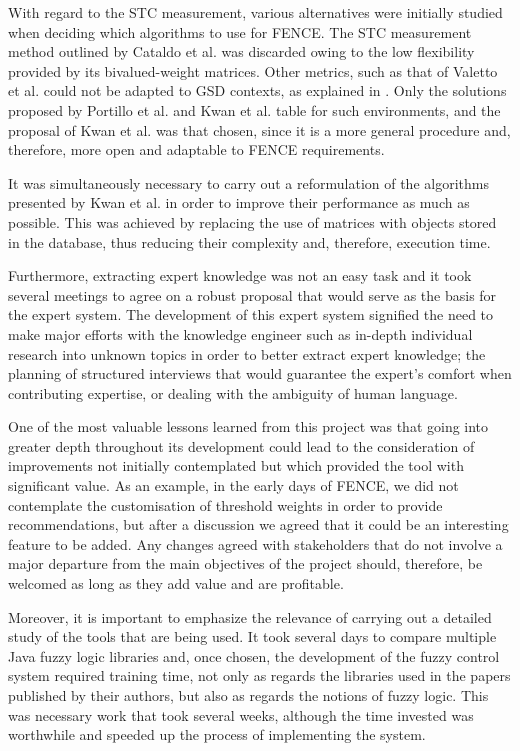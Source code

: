 With regard to the STC measurement, various alternatives were initially studied when deciding which algorithms to use for FENCE. The STC measurement method outlined by Cataldo et al. \cite{cataldo_identification_2006, cataldo_socio-technical_2008} was discarded owing to the low flexibility provided by its bivalued-weight matrices. Other metrics, such as that of Valetto et al. \cite{valetto_using_2007} could not be adapted to GSD contexts, as explained in \cite{sierra_systematic_2018}. Only the solutions proposed by Portillo et al. \cite{portillo_2014} and Kwan et al. \cite{kwan_weighted_2009, kwan_does_2011} table for such environments, and the proposal of Kwan et al. was that chosen, since it is a more general procedure and, therefore, more open and adaptable to FENCE requirements.

It was simultaneously necessary to carry out a reformulation of the algorithms presented by Kwan et al. in order to improve their performance as much as possible. This was achieved by replacing the use of matrices with objects stored in the database, thus reducing their complexity and, therefore, execution time.

Furthermore, extracting expert knowledge was not an easy task and it took several meetings to agree on a robust proposal that would serve as the basis for the expert system. The development of this expert system signified the need to make major efforts with the knowledge engineer such as in-depth individual research into unknown topics in order to better extract expert knowledge; the planning of structured interviews that would guarantee the expert's comfort when contributing expertise, or dealing with the ambiguity of human language.

One of the most valuable lessons learned from this project was that going into greater depth throughout its development could lead to the consideration of improvements not initially contemplated but which provided the tool with significant value. As an example, in the early days of FENCE, we did not contemplate the customisation of threshold weights in order to provide recommendations, but after a discussion we agreed that it could be an interesting feature to be added. Any changes agreed with stakeholders that do not involve a major departure from the main objectives of the project should, therefore, be welcomed as long as they add value and are profitable.

Moreover, it is important to emphasize the relevance of carrying out a detailed study of the tools that are being used. It took several days to compare multiple Java fuzzy logic libraries and, once chosen, the development of the fuzzy control system required training time, not only as regards the libraries used in the papers published by their authors, but also as regards the notions of fuzzy logic. This was necessary work that took several weeks, although the time invested was worthwhile and speeded up the process of implementing the system.

